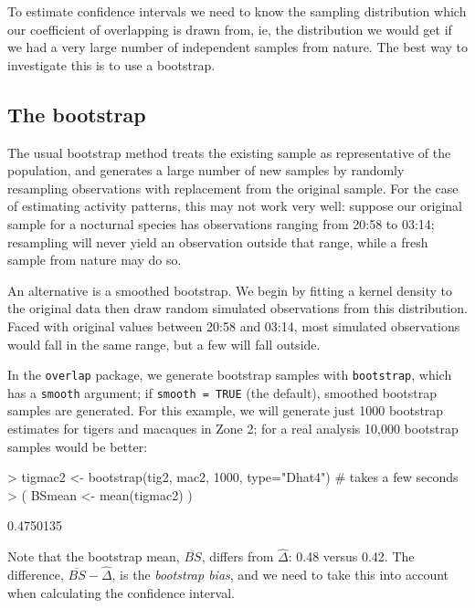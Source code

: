 \documentclass[a4paper]{article}
\begin{document}
To estimate confidence intervals we need to know the sampling distribution which our coefficient of overlapping is drawn from, ie, the distribution we would get if we had a very large number of independent samples from nature. The best way to investigate this is to use a bootstrap.

\subsection{The bootstrap}
\label{subsec:bootstrap}

The usual bootstrap method treats the existing sample as representative of the population, and generates a large number of new samples by randomly resampling observations with replacement from the original sample. For the case of estimating activity patterns, this may not work very well: suppose our original sample for a nocturnal species has observations ranging from 20:58 to 03:14; resampling will never yield an observation outside that range, while a fresh sample from nature may do so.

An alternative is a smoothed bootstrap. We begin by fitting a kernel density to the original data then draw random simulated observations from this distribution. Faced with original values between 20:58 and 03:14, most simulated observations would fall in the same range, but a few will fall outside.

 In the \texttt{overlap} package, we generate bootstrap samples with \texttt{bootstrap}, which has a \texttt{smooth} argument; if \texttt{smooth = TRUE} (the default), smoothed bootstrap samples are generated. For this example, we will generate just 1000 bootstrap estimates for tigers and macaques in Zone 2; for a real analysis 10,000 bootstrap samples would be better:

\begin{Schunk}
\begin{Sinput}
> tigmac2 <- bootstrap(tig2, mac2, 1000, type="Dhat4")  # takes a few seconds
> ( BSmean <- mean(tigmac2) )
\end{Sinput}
\begin{Soutput}
[1] 0.4750135
\end{Soutput}
\end{Schunk}

Note that the bootstrap mean, $\overline{BS}$, differs from $\hat{\Delta}$: 0.48 versus 0.42. The difference, $\overline{BS} - \hat{\Delta}$, is the \emph{bootstrap bias}, and we need to take this into account when calculating the confidence interval.
\end{document}
